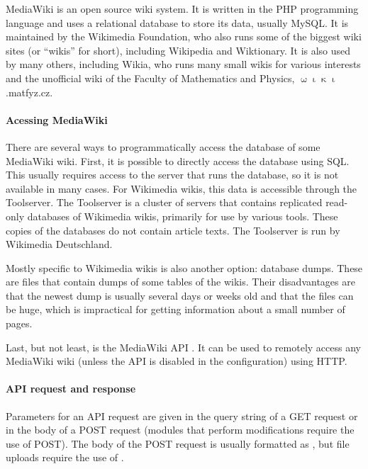 \label{mediawiki}

MediaWiki \cite{mediawiki} is an open source wiki system.
It is written in the \acs{PHP} programming language and uses a relational database to store its data,
usually MySQL.
It is maintained by the Wikimedia Foundation,
who also runs some of the biggest wiki sites (or “wikis” for short),
including Wikipedia and Wiktionary.
It is also used by many others, including Wikia, who runs many small wikis for various interests and
the unofficial wiki of the Faculty of Mathematics and Physics, $\upomega\upiota\upkappa\upiota$.matfyz.cz.

\paragraph{Acessing MediaWiki}

There are several ways to programmatically access the database of some MediaWiki wiki.
First, it is possible to directly access the database using \ac{SQL}.
This usually requires access to the server that runs the database, so it is not available in many cases.
For Wikimedia wikis, this data is accessible through the Toolserver.
The Toolserver is a cluster of servers that contains replicated read-only databases of Wikimedia wikis,
primarily for use by various tools.
These copies of the databases do not contain article texts.
The Toolserver is run by Wikimedia Deutschland.

Mostly specific to Wikimedia wikis is also another option: database dumps. These are files that contain
dumps of some tables of the wikis. Their disadvantages are that the newest dump is usually several days or weeks old
and that the files can be huge, which is impractical for getting information about a small number of pages.

Last, but not least, is the MediaWiki API \cite{mediawiki-api}.
It can be used to remotely access any MediaWiki wiki (unless the \ac{API} is disabled in the configuration)
using \ac{HTTP}.

\paragraph{API request and response}

Parameters for an \ac{API} request are given in the query string of a GET request or in the body of a POST request
(modules that perform modifications require the use of POST).
The body of the POST request is usually formatted as ,
but file uploads require the use of .

